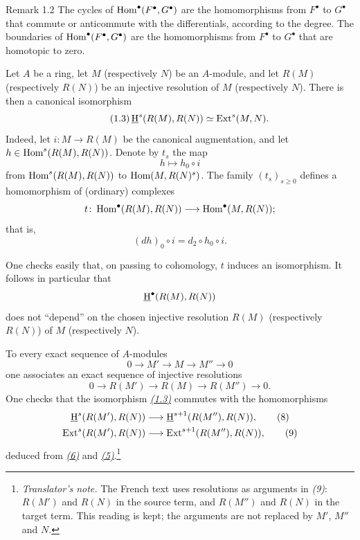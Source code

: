 \begin{sgaremark}{Remark 1.2}
The cycles of $\operatorname{Hom}^{\bullet}(F^{\bullet},G^{\bullet})$ are the
homomorphisms from $F^{\bullet}$ to $G^{\bullet}$ that commute or
anticommute with the differentials, according to the degree. The boundaries
of $\operatorname{Hom}^{\bullet}(F^{\bullet},G^{\bullet})$ are the homomorphisms from
$F^{\bullet}$ to $G^{\bullet}$ that are homotopic to zero.
\end{sgaremark}

\newpage
Let $A$ be a ring, let $M$ (respectively $N$) be an $A$-module, and let
$R(M)$ (respectively $R(N)$) be an injective resolution of $M$ (respectively
$N$). There is then a canonical isomorphism
\begin{equation*}\tag{1.3}\label{eq:V.1.3}
  \mathop{\underline{\mathrm H}}\nolimits^s(R(M),R(N))\simeq\operatorname{Ext}^s(M,N).
\end{equation*}
Indeed, let $i\colon M\to R(M)$ be the canonical augmentation, and let
$h\in\operatorname{Hom}^s(R(M),R(N))$. Denote by $t_s$ the map
\[
  h\longmapsto h_0\circ i
\]
from $\operatorname{Hom}^s(R(M),R(N))$ to $\operatorname{Hom}(M,R(N)^s)$. The family
$(t_s)_{s\geq 0}$ defines a homomorphism of (ordinary) complexes
\[
  t\colon \operatorname{Hom}^{\bullet}(R(M),R(N))
    \longrightarrow \operatorname{Hom}^{\bullet}(M,R(N));
\]
that is,
\[
  (dh)_0\circ i=d_2\circ h_0\circ i.
\]

One checks easily that, on passing to cohomology, $t$ induces an isomorphism.
It follows in particular that
\[
  \mathop{\underline{\mathrm H}}\nolimits^{\bullet}(R(M),R(N))
\]
does not ``depend'' on the chosen injective resolution $R(M)$ (respectively
$R(N)$) of $M$ (respectively $N$).

To every exact sequence of $A$-modules
\begin{equation}\tag{5}\label{eq:V.5}
  0\longrightarrow M'\longrightarrow M\longrightarrow M''\longrightarrow 0
\end{equation}
one associates an exact sequence of injective resolutions
\begin{equation}\tag{6}\label{eq:V.6}
  0\longrightarrow R(M')\longrightarrow R(M)
    \longrightarrow R(M'')\longrightarrow 0.
\end{equation}
One checks that the isomorphism \emph{\hyperref[eq:V.1.3]{(1.3)}} commutes with the homomorphisms
\begin{align}
  \mathop{\underline{\mathrm H}}\nolimits^s(R(M'),R(N))
    &\longrightarrow \mathop{\underline{\mathrm H}}\nolimits^{s+1}(R(M''),R(N)),\tag{8}\label{eq:V.8}\\
  \operatorname{Ext}^s(R(M'),R(N))
    &\longrightarrow \operatorname{Ext}^{s+1}(R(M''),R(N)),\tag{9}\label{eq:V.9}
\end{align}
deduced from \emph{\hyperref[eq:V.6]{(6)}} and \emph{\hyperref[eq:V.5]{(5)}}.\footnote{\textit{Translator's note.}
The French text uses resolutions as arguments in \emph{(9)}: $R(M')$ and
$R(N)$ in the source term, and $R(M'')$ and $R(N)$ in the target term. This
reading is kept; the arguments are not replaced by $M'$, $M''$ and $N$.}

